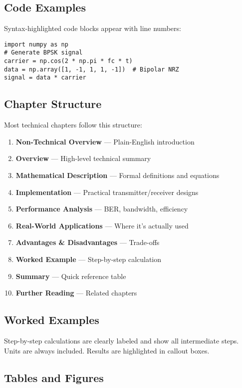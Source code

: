 \subsection*{Code Examples}

Syntax-highlighted code blocks appear with line numbers:

\begin{verbatim}
import numpy as np
# Generate BPSK signal
carrier = np.cos(2 * np.pi * fc * t)
data = np.array([1, -1, 1, 1, -1])  # Bipolar NRZ
signal = data * carrier
\end{verbatim}

\subsection*{Chapter Structure}

Most technical chapters follow this structure:

\begin{enumerate}
\item \textbf{Non-Technical Overview} --- Plain-English introduction
\item \textbf{Overview} --- High-level technical summary
\item \textbf{Mathematical Description} --- Formal definitions and equations
\item \textbf{Implementation} --- Practical transmitter/receiver designs
\item \textbf{Performance Analysis} --- BER, bandwidth, efficiency
\item \textbf{Real-World Applications} --- Where it's actually used
\item \textbf{Advantages \& Disadvantages} --- Trade-offs
\item \textbf{Worked Example} --- Step-by-step calculation
\item \textbf{Summary} --- Quick reference table
\item \textbf{Further Reading} --- Related chapters
\end{enumerate}

\subsection*{Worked Examples}

Step-by-step calculations are clearly labeled and show all intermediate steps. Units are always included. Results are highlighted in callout boxes.

\subsection*{Tables and Figures}

